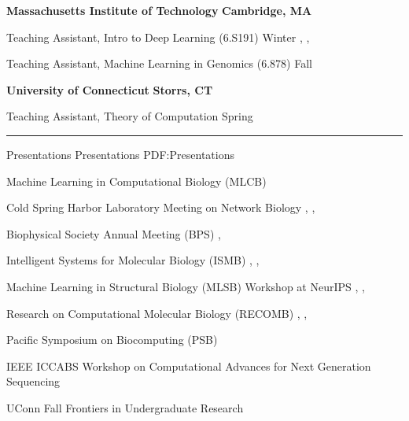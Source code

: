 \documentclass[letterpaper,MMMyyyy,nonstopmode]{simpleresumecv}
\begin{document}
\begin{Body}
\Entry
{\textbf{Massachusetts Institute of Technology}}
\hfill \textbf{Cambridge, MA}

\Gap
\Item Teaching Assistant, Intro to Deep Learning (6.S191)
\hfill
Winter , , 

\Gap
\Item Teaching Assistant, Machine Learning in Genomics (6.878)
\hfill
Fall 

\BigGap
\Entry
{\textbf{University of Connecticut}}
\hfill \textbf{Storrs, CT}

\Gap
\Item Teaching Assistant, Theory of Computation
\hfill
Spring 


\BigGap
\hrule
\Section
{Presentations}
{Presentations}
{PDF:Presentations}

\Entry
{Machine Learning in Computational Biology (MLCB)}
\hfill
{}
\Gap

\Entry
{Cold Spring Harbor Laboratory Meeting on Network Biology}
\hfill
{}, , 
\Gap

\Entry
{Biophysical Society Annual Meeting (BPS)}
\hfill
{}, 
\Gap

\Entry
{Intelligent Systems for Molecular Biology (ISMB)}
\hfill
{}, , 
\Gap

\Entry
{Machine Learning in Structural Biology (MLSB) Workshop at NeurIPS}
\hfill
{}, , 
\Gap

\Entry
{Research on Computational Molecular Biology (RECOMB)}
\hfill
{}, , 
\Gap

\Entry
{Pacific Symposium on Biocomputing (PSB)}
\hfill
{}
\Gap

\Entry
{IEEE ICCABS Workshop on Computational Advances for Next Generation Sequencing}
\hfill
{}
\Gap

\Entry
{UConn Fall Frontiers in Undergraduate Research}
\hfill
{}
\Gap


\end{Body}
\end{document}
